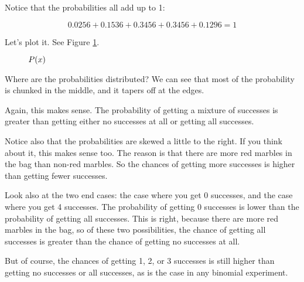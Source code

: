 \documentclass[../../../main.tex]{subfiles}
\begin{document}
\noindent
Notice that the probabilities all add up to 1:

\begin{equation*}
    0.0256 + 0.1536 + 0.3456 + 0.3456 + 0.1296 = 1
\end{equation*}

\noindent
Let's plot it. See Figure \ref{plot:example-2}.

\begin{figure}[ht]
  \caption{\label{plot:example-2} $\Probability{\RandVarVal/}$}
\end{figure}

Where are the probabilities distributed? We can see that most of the probability is chunked in the middle, and it tapers off at the edges. 

Again, this makes sense. The probability of getting a mixture of successes is greater than getting either no successes at all or getting all successes.

Notice also that the probabilities are skewed a little to the right. If you think about it, this makes sense too. The reason is that there are more red marbles in the bag than non-red marbles. So the chances of getting more successes is higher than getting fewer successes.

Look also at the two end cases: the case where you get 0 successes, and the case where you get 4 successes. The probability of getting 0 successes is lower than the probability of getting all successes. This is right, because there are more red marbles in the bag, so of these two possibilities, the chance of getting all successes is greater than the chance of getting no successes at all.

But of course, the chances of getting 1, 2, or 3 successes is still higher than getting no successes or all successes, as is the case in any binomial experiment.


\end{document}
